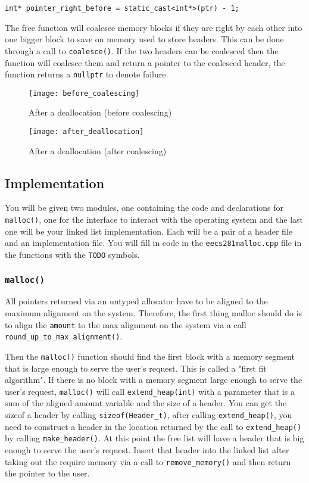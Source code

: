 \documentclass{article}
\begin{document}
\begin{lstlisting}
int* pointer_right_before = static_cast<int*>(ptr) - 1;
\end{lstlisting}

The free function will coalesce memory blocks if they are right by each other
into one bigger block to save on memory used to store headers.  This can be
done through a call to \texttt{coalesce()}.  If the two headers can be
coalesced then the function will coalesce them and return a pointer to the
coalesced header, the function returns a \texttt{nullptr} to denote failure.

\begin{figure}[!htb]
\centering
\texttt{[image: before\_coalescing]}
\caption{After a deallocation (before coalescing)}
\end{figure}

\begin{figure}[!htb]
\centering
\texttt{[image: after\_deallocation]}
\caption{After a deallocation (after coalescing)}
\end{figure}

\newpage
\subsection{Implementation}
You will be given two modules, one containing the
code and declarations for \texttt{malloc()}, one for the interface to interact
with the operating system and the last one will be your linked list
implementation.  Each will be a pair of a header file and an implementation
file.  You will fill in code in the \texttt{eecs281malloc.cpp} file in the
functions with the \texttt{TODO} symbols.

\subsubsection{\texttt{malloc()}}
All pointers returned via an untyped allocator have to be aligned to the
maximum alignment on the system.  Therefore, the first thing malloc should do
is to align the \texttt{amount} to the max alignment on the system via a call
\texttt{round\_up\_to\_max\_alignment()}.

Then the \texttt{malloc()} function should find the first block with a memory
segment that is large enough to serve the user's request.  This is called a
"first fit algorithm".  If there is no block with a memory segment large
enough to serve the user's request, \texttt{malloc()} will call
\texttt{extend\_heap(int)} with a parameter that is a sum of the aligned
amount variable and the size of a header.  You can get the sizeof a header by
calling \texttt{sizeof(Header\_t)}, after calling \texttt{extend\_heap()}, you
need to construct a header in the location returned by the call to
\texttt{extend\_heap()} by calling \texttt{make\_header()}.  At this point the
free list will have a header that is big enough to serve the user's request.
Insert that header into the linked list after taking out the require memory
via a call to \texttt{remove\_memory()} and then return the pointer to the
user.
\end{document}
